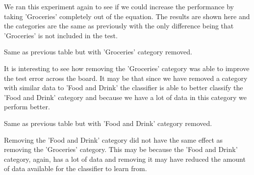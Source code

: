 We ran this experiment again to see if we could increase the performance by taking 'Groceries' completely out of the equation. The results are shown here and the categories are the same as previously with the only difference being that 'Groceries' is not included in the test.

\begin{table}[ht]
    \centering  
    \caption{Same as previous table but with 'Groceries' category removed.}
    
    \label{tab:lscv_category_reduction_no_groceries} 
\end{table}

It is interesting to see how removing the 'Groceries' category was able to improve the test error across the board. It may be that since we have removed a category with similar data to 'Food and Drink' the classifier is able to better classify the 'Food and Drink' category and because we have a lot of data in this category we perform better. 

\begin{table}[ht]
    \centering  
    \caption{Same as previous table but with 'Food and Drink' category removed.}
    
    \label{tab:lscv_category_reduction_no_food} 
\end{table}

Removing the 'Food and Drink' category did not have the same effect as removing the 'Groceries' category. This may be because the 'Food and Drink' category, again, has a lot of data and removing it may have reduced the amount of data available for the classifier to learn from.